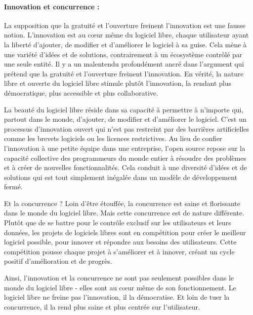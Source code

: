 \paragraph{Innovation et concurrence :} La supposition que la gratuité et l'ouverture freinent l'innovation est une fausse notion. L'innovation est au cœur même du logiciel libre, chaque utilisateur ayant la liberté d'ajouter, de modifier et d'améliorer le logiciel à sa guise. Cela mène à une variété d'idées et de solutions, contrairement à un écosystème contrôlé par une seule entité.
Il y a un malentendu profondément ancré dans l'argument qui prétend que la gratuité et l'ouverture freinent l'innovation. En vérité, la nature libre et ouverte du logiciel libre stimule plutôt l'innovation, la rendant plus démocratique, plus accessible et plus collaborative.

La beauté du logiciel libre réside dans sa capacité à permettre à n'importe qui, partout dans le monde, d'ajouter, de modifier et d'améliorer le logiciel. C'est un processus d'innovation ouvert qui n'est pas restreint par des barrières artificielles comme les brevets logiciels ou les licences restrictives. Au lieu de confier l'innovation à une petite équipe dans une entreprise, l'open source repose sur la capacité collective des programmeurs du monde entier à résoudre des problèmes et à créer de nouvelles fonctionnalités. Cela conduit à une diversité d'idées et de solutions qui est tout simplement inégalée dans un modèle de développement fermé.

Et la concurrence ? Loin d'être étouffée, la concurrence est saine et florissante dans le monde du logiciel libre. Mais cette concurrence est de nature différente. Plutôt que de se battre pour le contrôle exclusif sur les utilisateurs et leurs données, les projets de logiciels libres sont en compétition pour créer le meilleur logiciel possible, pour innover et répondre aux besoins des utilisateurs. Cette compétition pousse chaque projet à s'améliorer et à innover, créant un cycle positif d'amélioration et de progrès.

Ainsi, l'innovation et la concurrence ne sont pas seulement possibles dans le monde du logiciel libre - elles sont au cœur même de son fonctionnement. Le logiciel libre ne freine pas l'innovation, il la démocratise. Et loin de tuer la concurrence, il la rend plus saine et plus centrée sur l'utilisateur.




